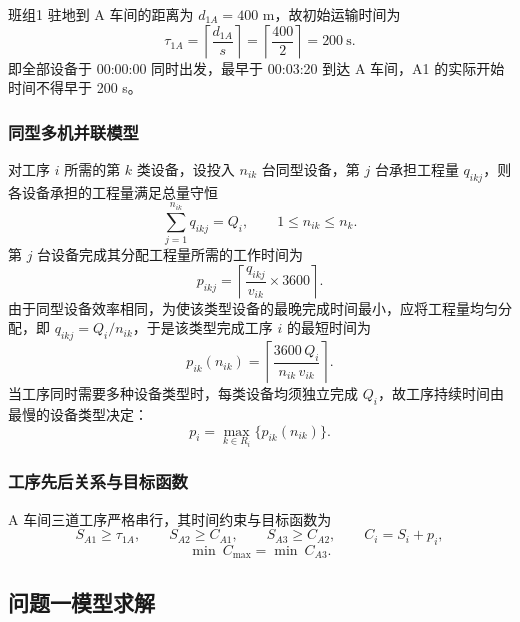 \documentclass[12pt,a4paper]{article}
\begin{document}
班组1 驻地到 A 车间的距离为 $d_{1A}=400$ m，故初始运输时间为
\begin{equation}
\tau_{1A}=\left\lceil\frac{d_{1A}}{s}\right\rceil=\left\lceil\frac{400}{2}\right\rceil=200\ \text{s}.
\end{equation}
即全部设备于 00:00:00 同时出发，最早于 00:03:20 到达 A 车间，A1 的实际开始时间不得早于 200 s。

\subsubsection{同型多机并联模型}

对工序 $i$ 所需的第 $k$ 类设备，设投入 $n_{ik}$ 台同型设备，第 $j$ 台承担工程量 $q_{ikj}$，则各设备承担的工程量满足总量守恒
\begin{equation}
\sum_{j=1}^{n_{ik}} q_{ikj}=Q_i,\qquad 1\le n_{ik}\le n_k .
\end{equation}
第 $j$ 台设备完成其分配工程量所需的工作时间为
\begin{equation}
p_{ikj}=\left\lceil\frac{q_{ikj}}{v_{ik}}\times 3600\right\rceil .
\end{equation}
由于同型设备效率相同，为使该类型设备的最晚完成时间最小，应将工程量均匀分配，即 $q_{ikj}=Q_i/n_{ik}$，于是该类型完成工序 $i$ 的最短时间为
\begin{equation}
p_{ik}(n_{ik})=\left\lceil\frac{3600\,Q_i}{n_{ik}\,v_{ik}}\right\rceil .
\end{equation}
当工序同时需要多种设备类型时，每类设备均须独立完成 $Q_i$，故工序持续时间由最慢的设备类型决定：
\begin{equation}
p_i=\max_{k\in R_i}\bigl\{p_{ik}(n_{ik})\bigr\}.
\end{equation}

\subsubsection{工序先后关系与目标函数}

A 车间三道工序严格串行，其时间约束与目标函数为
\begin{equation}
S_{A1}\ge\tau_{1A},\qquad S_{A2}\ge C_{A1},\qquad S_{A3}\ge C_{A2},\qquad C_i=S_i+p_i ,
\end{equation}
\begin{equation}
\min\ C_{\max}=\min\ C_{A3}.
\end{equation}

\subsection{问题一模型求解}
\end{document}
